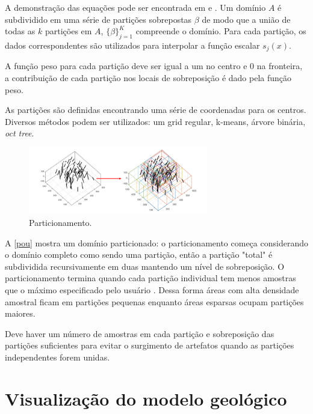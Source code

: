 A demonstração das equações pode ser encontrada em  e . Um domínio $A$ é subdividido em uma série de partições sobrepostas $\beta$ de modo que a união de todas as $k$ partições em $A$, $\{ \beta \}^K_{j=1}$ compreende o domínio. Para cada partição, os dados correspondentes são utilizados para interpolar a função escalar $s_j(x)$.

A função peso para cada partição deve ser igual a um no centro e 0 na fronteira, a contribuição de cada partição nos locais de sobreposição é dado pela função peso.

As partições são definidas encontrando uma série de coordenadas para os centros. Diversos métodos podem ser utilizados: um grid regular, k-means, árvore binária, \textit{oct tree}.

\begin{figure}[H]
	\caption{\label{pou}Particionamento.}
	\begin{center}
		\includegraphics[width=0.7\textwidth]{capitulo_2/pou.jpg}
	\end{center}
\end{figure}

A \autoref{pou} mostra um domínio particionado: o particionamento começa considerando o domínio completo como sendo uma partição, então a partição "total" é subdividida recursivamente em duas mantendo um nível de sobreposição. O particionamento termina quando cada partição individual tem menos amostras que o máximo especificado pelo usuário \cite{martin2017implicitmodeling}. Dessa forma áreas com alta densidade amostral ficam em partições pequenas enquanto áreas esparsas ocupam partições maiores.

Deve haver um número de amostras em cada partição e sobreposição das partições suficientes para evitar o surgimento de artefatos quando as partições independentes forem unidas.

\section{Visualização do modelo geológico}

